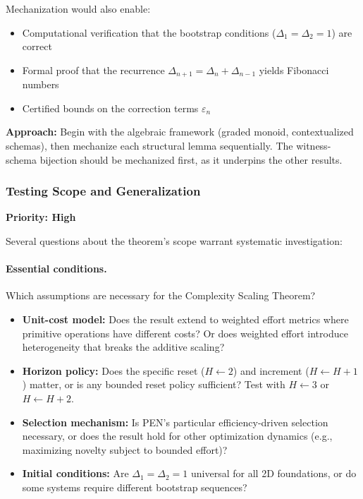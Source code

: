 \documentclass[11pt]{article}
\theoremstyle{definition}
\theoremstyle{remark}
\begin{document}
Mechanization would also enable:
\begin{itemize}
\item Computational verification that the bootstrap conditions ($\Delta_1 = \Delta_2 = 1$) are correct
\item Formal proof that the recurrence $\Delta_{n+1} = \Delta_n + \Delta_{n-1}$ yields Fibonacci numbers
\item Certified bounds on the correction terms $\varepsilon_n$
\end{itemize}

\textbf{Approach:} Begin with the algebraic framework (graded monoid, contextualized schemas),
then mechanize each structural lemma sequentially. The witness-schema bijection should be mechanized
first, as it underpins the other results.

\subsubsection{Testing Scope and Generalization}

\textbf{Priority: High}

Several questions about the theorem's scope warrant systematic investigation:

\paragraph{Essential conditions.}
Which assumptions are necessary for the Complexity Scaling Theorem?

\begin{itemize}
\item \textbf{Unit-cost model:} Does the result extend to weighted effort metrics where primitive
operations have different costs? Or does weighted effort introduce heterogeneity that breaks the
additive scaling?

\item \textbf{Horizon policy:} Does the specific reset ($H \gets 2$) and increment ($H \gets H+1$) matter,
or is any bounded reset policy sufficient? Test with $H \gets 3$ or $H \gets H+2$.

\item \textbf{Selection mechanism:} Is PEN's particular efficiency-driven selection necessary, or
does the result hold for other optimization dynamics (e.g., maximizing novelty subject to bounded
effort)?

\item \textbf{Initial conditions:} Are $\Delta_1 = \Delta_2 = 1$ universal for all 2D foundations, or do
some systems require different bootstrap sequences?
\end{itemize}
\end{document}
